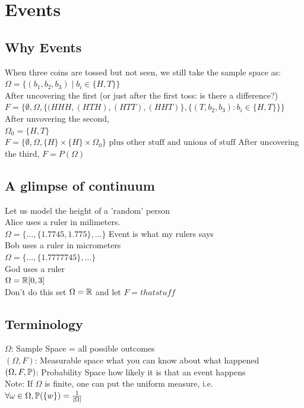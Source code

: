 \section{Events}
\subsection*{Why Events}

When three coins are tossed but not seen, we still take the sample space as:\\
$\Omega=\{(b_1,b_2,b_3) \mid b_i \in \{H, T\}\}$\\
After uncovering the first (or just after the first toss: is there a difference?)\\
$F=\{\emptyset, \Omega, \{(HHH,(HTH),(HTT),(HHT)\}, \{(T,b_2,b_3): b_i \in \{H,T\}\}\}$\\
After unvovering the second,\\
$\Omega_0=\{H,T\}$\\
$F=\{\emptyset, \Omega, \{H\}\times\{H\}\times\Omega_0\} \text{ plus other stuff and unions of stuff}$
After uncovering the third,
$F=P(\Omega)$

\subsection*{A glimpse of continuum}
Let us model the height of a 'random' person\\
Alice uses a ruler in milimeters.\\
$\Omega=\{\dots,\{1.7745,1.775\},\dots\}$ Event is what my rulers says\\
Bob uses a ruler in micrometers\\
$\Omega=\{\dots,\{1.7777745\},\dots\}$\\
God uses a ruler\\
$\Omega=\R[0,3]$\\
Don't do this set $\Omega=\R$ and let $F = that stuff$

\subsection*{Terminology}
$\Omega$: Sample Space = all possible outcomes\\
$(\Omega,F)$: Measurable space what you can know about what happened\\
$(\Omega, F, \P)$: Probability Space  how likely it is that an event happens\\
Note: If $\Omega$ is finite, one can put the uniform measure, i.e.\\
$\forall \omega \in \Omega, \P(\{w\})=\frac{1}{|\Omega|}$

